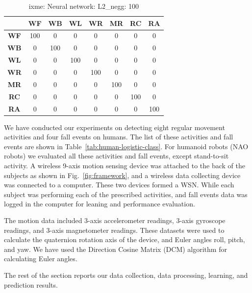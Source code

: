 \documentclass{IEEEtran}
\begin{document}
\begin{table}
\caption{ixme: Neural network: L2\_negg: 100}
{
\begin{tabular}{|c|c|c|c|c|c|c|c|}
\hline 
 & \textbf{WF} & \textbf{WB} & \textbf{WL} & \textbf{WR} & \textbf{MR} & 
\textbf{RC} & \textbf{RA} \\ \hline 
\textbf{WF} & 100 &  0 &  0 &  0 &  0 &  0 &  0 \\ \hline
\textbf{WB} & 0 &  100 &  0 &  0 &  0 &  0 &  0 \\ \hline
\textbf{WL} & 0 &  0 &  100 &  0 &  0 &  0 &  0 \\ \hline
\textbf{WR} & 0 &  0 &  0 &  100 &  0 &  0 &  0 \\ \hline
\textbf{MR} & 0 &  0 &  0 &  0 &  100 &  0 &  0 \\ \hline
\textbf{RC} & 0 &  0 &  0 &  0 &  0 &  100 &  0 \\ \hline
\textbf{RA} & 0 &  0 &  0 &  0 &  0 &  0 &  100 \\ \hline
\end{tabular}
}
\end{table}



We have conducted our experiments on detecting eight regular movement activities and four fall events on 
humans. The list of these activities and fall events are shown in Table~\ref{tab:human-logistic-class}. For humanoid robots (NAO robots) we evaluated all these activities and fall events, except stand-to-sit activity. 
 A wireless 9-axis  motion sensing device was attached to the back of the subjects as shown in Fig.~\ref{fig:framework}, and a wireless data collecting device was connected to a computer. These two devices formed a WSN. While each subject was performing each of the prescribed activities, and fall events data was logged in the computer for leaning and performance evaluation.
\par
The motion data included 3-axis accelerometer readings, 3-axis gyroscope readings, and 3-axis magnetometer readings. These datasets were used to calculate
the quaternion rotation axis of the device, and Euler angles roll, pitch, and yaw. We have used the Direction Cosine Matrix (DCM) algorithm for calculating Euler angles. 
\par
The rest of the  section reports our data collection, data processing, learning, 
and prediction results.


\end{document}
